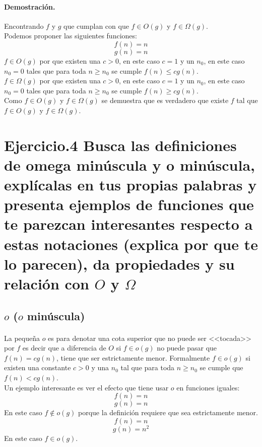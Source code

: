 \documentclass[12pt]{article}
\begin{document}
\paragraph{Demostración.} Encontrando $f$ y $g$ que cumplan con que $f\in O(g)$ y $f\in\Omega(g)$.\\
Podemos proponer las siguientes funciones:
\begin{equation}\label{f_ej3.3}
f(n) = n
\end{equation}
\begin{equation}\label{g_ej3.3}
g(n) = n
\end{equation}
$f\in O(g)$ por que existen una $c>0$, en este caso $c=1$ y un $n_{0}$, en este caso $n_{0}=0$ tales que para toda $n\geq n_{0}$ se cumple $f(n)\leq cg(n)$.\\
$f\in\Omega(g)$ por que existen una $c>0$, en este caso $c=1$ y un $n_{0}$, en este caso $n_{0}=0$ tales que para toda $n\geq n_{0}$ se cumple $f(n)\geq cg(n)$.\\
Como $f\in O(g)$ y $f\in\Omega(g)$ se demuestra que es verdadero que existe $f$ tal que $f\in O(g)$ y $f\in\Omega(g)$.
\pagebreak
\section{Ejercicio.4 Busca las definiciones de omega minúscula y o minúscula, explícalas en tus propias palabras y presenta ejemplos de funciones que te parezcan interesantes respecto a estas notaciones (explica por que te lo parecen), da propiedades y su relación con $O$ y $\Omega$}
\subsection{$o$ ($o$ minúscula)}
\paragraph{} La pequeña $o$ es para denotar una cota superior que no puede ser <<tocada>> por $f$ es decir que a diferencia de $O$ si $f\in o(g)$ no puede pasar que $f(n)=cg(n)$, tiene que ser estrictamente menor. Formalmente $f\in o(g)$ si existen una constante $c>0$ y una $n_{0}$ tal que para toda $n\geq n_{0}$ se cumple que $f(n)<cg(n)$.\\
Un ejemplo interesante es ver el efecto que tiene usar $o$ en funciones iguales:
\begin{equation}\label{f_ej4.1}
f(n) = n
\end{equation}
\begin{equation}\label{g_ej4.1}
g(n) = n
\end{equation}
En este caso $f\notin o(g)$ porque la definición requiere que sea estrictamente menor.
\begin{equation}\label{f2_ej4.1}
f(n) = n
\end{equation}
\begin{equation}\label{g2_ej4.1}
g(n) = n^{2}
\end{equation}
En este caso $f\in o(g)$.
\end{document}
